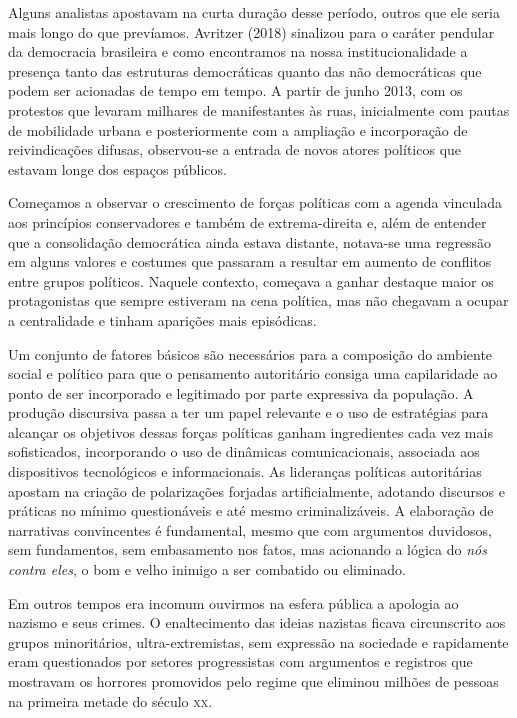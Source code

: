 Alguns analistas apostavam na curta duração desse período, outros que
ele seria mais longo do que prevíamos. Avritzer (2018) sinalizou para o
caráter pendular da democracia brasileira e como encontramos na nossa
institucionalidade a presença tanto das estruturas democráticas quanto
das não democráticas que podem ser acionadas de tempo em tempo. A partir
de junho 2013, com os protestos que levaram milhares de manifestantes às
ruas, inicialmente com pautas de mobilidade urbana e posteriormente com
a ampliação e incorporação de reivindicações difusas, observou-se a
entrada de novos atores políticos que estavam longe dos espaços
públicos.

Começamos a observar o crescimento de forças políticas com a agenda
vinculada aos princípios conservadores e também de extrema-direita e,
além de entender que a consolidação democrática ainda estava distante,
notava-se uma regressão em alguns valores e costumes que passaram a
resultar em aumento de conflitos entre grupos políticos. Naquele
contexto, começava a ganhar destaque maior os protagonistas que sempre
estiveram na cena política, mas não chegavam a ocupar a centralidade e
tinham aparições mais episódicas.

Um conjunto de fatores básicos são necessários para a composição do
ambiente social e político para que o pensamento autoritário consiga uma
capilaridade ao ponto de ser incorporado e legitimado por parte
expressiva da população. A produção discursiva passa a ter um papel
relevante e o uso de estratégias para alcançar os objetivos dessas
forças políticas ganham ingredientes cada vez mais sofisticados,
incorporando o uso de dinâmicas comunicacionais, associada aos
dispositivos tecnológicos e informacionais. As lideranças políticas
autoritárias apostam na criação de polarizações forjadas
artificialmente, adotando discursos e práticas no mínimo questionáveis e
até mesmo criminalizáveis. A elaboração de narrativas convincentes é
fundamental, mesmo que com argumentos duvidosos, sem fundamentos, sem
embasamento nos fatos, mas acionando a lógica do \textit{nós contra eles}, o bom
e velho inimigo a ser combatido ou eliminado.

Em outros tempos era incomum ouvirmos na esfera pública a apologia ao
nazismo e seus crimes. O enaltecimento das ideias nazistas ficava
circunscrito aos grupos minoritários, ultra-extremistas, sem expressão
na sociedade e rapidamente eram questionados por setores progressistas
com argumentos e registros que mostravam os horrores promovidos pelo
regime que eliminou milhões de pessoas na primeira metade do século \textsc{xx}.

